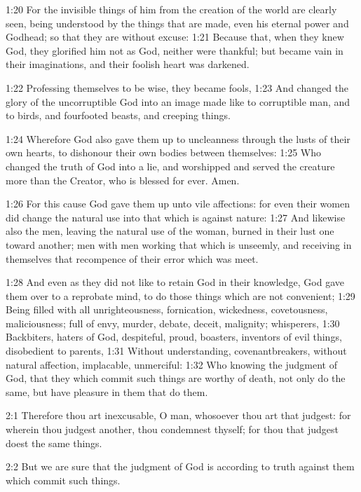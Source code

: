 1:20 For the invisible things of him from the creation of the world
are clearly seen, being understood by the things that are made, even
his eternal power and Godhead; so that they are without excuse: 1:21
Because that, when they knew God, they glorified him not as God,
neither were thankful; but became vain in their imaginations, and
their foolish heart was darkened.

1:22 Professing themselves to be wise, they became fools, 1:23 And
changed the glory of the uncorruptible God into an image made like to
corruptible man, and to birds, and fourfooted beasts, and creeping
things.

1:24 Wherefore God also gave them up to uncleanness through the lusts
of their own hearts, to dishonour their own bodies between themselves:
1:25 Who changed the truth of God into a lie, and worshipped and
served the creature more than the Creator, who is blessed for ever.
Amen.

1:26 For this cause God gave them up unto vile affections: for even
their women did change the natural use into that which is against
nature: 1:27 And likewise also the men, leaving the natural use of the
woman, burned in their lust one toward another; men with men working
that which is unseemly, and receiving in themselves that recompence of
their error which was meet.

1:28 And even as they did not like to retain God in their knowledge,
God gave them over to a reprobate mind, to do those things which are
not convenient; 1:29 Being filled with all unrighteousness,
fornication, wickedness, covetousness, maliciousness; full of envy,
murder, debate, deceit, malignity; whisperers, 1:30 Backbiters, haters
of God, despiteful, proud, boasters, inventors of evil things,
disobedient to parents, 1:31 Without understanding, covenantbreakers,
without natural affection, implacable, unmerciful: 1:32 Who knowing
the judgment of God, that they which commit such things are worthy of
death, not only do the same, but have pleasure in them that do them.

2:1 Therefore thou art inexcusable, O man, whosoever thou art that
judgest: for wherein thou judgest another, thou condemnest thyself;
for thou that judgest doest the same things.

2:2 But we are sure that the judgment of God is according to truth
against them which commit such things.


